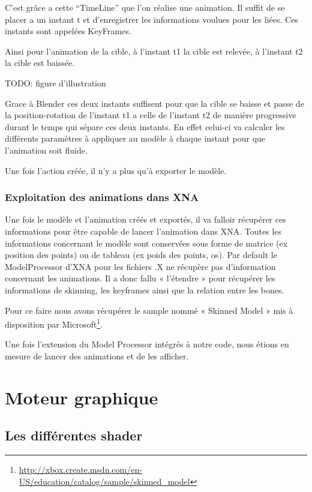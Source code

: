 \documentclass[11pt]{report}
\begin{document}
C’est grâce a cette ``TimeLine'' que l’on réalise une animation. Il suffit de se placer a un instant t et d’enregistrer les informations voulues pour les liées. Ces instants sont appelées KeyFrames.

Ainsi pour l’animation de la cible, à l’instant t1 la cible est relevée, à l’instant t2 la cible est baissée.

TODO: figure d’illustration

Grace à Blender ces deux instants suffisent pour que la cible se baisse et passe de la position-rotation de l’instant t1 a celle de l’instant t2 de manière progressive durant le temps qui sépare ces deux instants. En effet celui-ci va calculer les différents paramètres  à appliquer au modèle à chaque instant pour que l’animation soit fluide.

Une fois l’action créée, il n’y a plus qu’à exporter le modèle.

\subsubsection{Exploitation des animations dans XNA}

Une fois le modèle et l’animation créés et exportés, il va falloir récupérer ces informations pour être capable de lancer l’animation dans XNA. Toutes les informations concernant le modèle sont conservées sous forme de matrice (ex position des points) ou de tableau (ex poids des points, os). 
Par default le ModelProcessor d’XNA pour les fichiers .X ne récupère pas d’information concernant les animations. Il a donc fallu « l’étendre » pour récupérer les informations de skinning, les  keyframes ainsi que la relation entre les bones.

Pour ce faire nous avons récupérer le sample nommé « Skinned Model » mis à disposition par Microsoft\footnote{\url{http://xbox.create.msdn.com/en-US/education/catalog/sample/skinned_model}}.

Une fois l’extension du Model Processor intégrés à notre code, nous étions en mesure de lancer des animations et de les afficher.


\newpage
\section{Moteur graphique}

\subsection{Les différentes shader}
\end{document}
